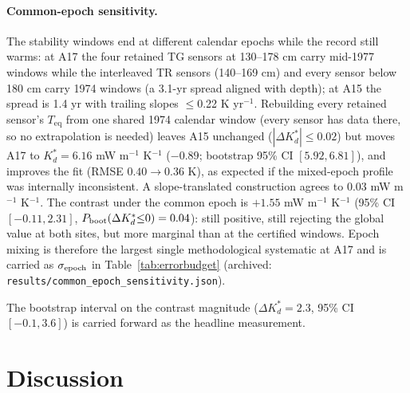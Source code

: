 \documentclass[11pt]{article}
\begin{document}
\paragraph*{Common-epoch sensitivity.}
The stability windows end at different calendar epochs while the
record still warms: at A17 the four retained TG sensors at 130--178 cm
carry mid-1977 windows while the interleaved TR sensors (140--169 cm) and
every sensor below 180 cm carry 1974 windows
(a 3.1-yr spread aligned with depth); at A15 the spread is 1.4 yr with
trailing slopes $\le$0.22 K yr$^{-1}$. Rebuilding every retained
sensor's $T_\mathrm{eq}$ from one shared 1974 calendar window (every
sensor has data there, so no extrapolation is needed) leaves A15 unchanged
($|\Delta K_d^{*}|\le 0.02$) but moves A17 to
$K_d^{*}=6.16$ mW m$^{-1}$ K$^{-1}$ ($-0.89$; bootstrap 95\% CI
$[5.92, 6.81]$), and improves the fit (RMSE
$0.40\rightarrow0.36$ K), as expected if the mixed-epoch profile was
internally inconsistent. A slope-translated construction agrees to
0.03 mW m$^{-1}$ K$^{-1}$. The contrast under the common epoch is
$+1.55$ mW m$^{-1}$ K$^{-1}$ (95\% CI $[-0.11, 2.31]$,
$P_{\rm boot}(\Delta K_d^{*}{\le}0)=0.04$): still positive, still
rejecting the global value at both sites, but more marginal than at the
certified windows. Epoch mixing is therefore the largest single
methodological systematic at A17 and is carried as $\sigma_{\rm epoch}$
in Table~\ref{tab:errorbudget}
(archived: \texttt{results/common\_epoch\_sensitivity.json}).

The bootstrap interval
on the contrast
magnitude ($\Delta
K_d^{*}=2.3$, 95\% CI $[-0.1,3.6]$) is carried forward
as the headline measurement.


\FloatBarrier
\section{Discussion}\label{sec:discussion}
\end{document}
